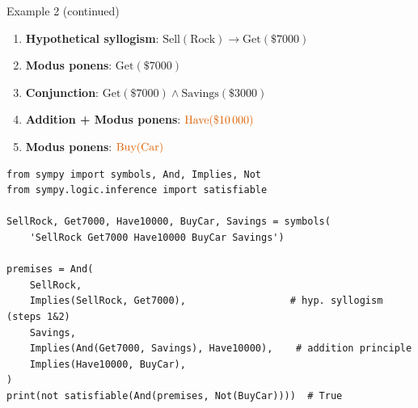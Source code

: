 \documentclass[aspectratio=169]{beamer}
\begin{document}
\begin{frame}[fragile]{Example 2 (continued)}
  \begin{enumerate}
    \item \textbf{Hypothetical syllogism}: \quad $\mathrm{Sell(Rock)} \to \mathrm{Get(\$7000)}$
    \item \textbf{Modus ponens}: \quad $\mathrm{Get(\$7000)}$
    \item \textbf{Conjunction}: \quad $\mathrm{Get(\$7000)} \wedge \mathrm{Savings(\$3000)}$
    \item \textbf{Addition + Modus ponens}: \quad $\textcolor{orangetheme}{\mathrm{Have(\$10\,000)}}$
    \item \textbf{Modus ponens}: \quad $\textcolor{orangetheme}{\mathrm{Buy(Car)}}$
  \end{enumerate}

  \begin{lstlisting}[style=python]
from sympy import symbols, And, Implies, Not
from sympy.logic.inference import satisfiable

SellRock, Get7000, Have10000, BuyCar, Savings = symbols(
    'SellRock Get7000 Have10000 BuyCar Savings')

premises = And(
    SellRock,
    Implies(SellRock, Get7000),                  # hyp. syllogism (steps 1&2)
    Savings,
    Implies(And(Get7000, Savings), Have10000),    # addition principle
    Implies(Have10000, BuyCar),
)
print(not satisfiable(And(premises, Not(BuyCar))))  # True
  \end{lstlisting}
\end{frame}
\end{document}
